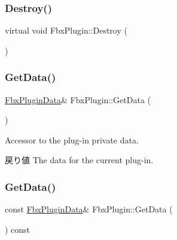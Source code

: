 \mbox{\label{class_fbx_plugin_a0a3b33c932cc862e539cef85d168b86a}} 
\subsubsection{\texorpdfstring{Destroy()}{Destroy()}}
{\footnotesize\ttfamily virtual void Fbx\+Plugin\+::\+Destroy (\begin{DoxyParamCaption}{ }\end{DoxyParamCaption})\hspace{0.3cm}{\ttfamily [pure virtual]}}

\mbox{\label{class_fbx_plugin_a2bcee62f35bb9ccaf60dddaa2bd42ed9}} 
\subsubsection{\texorpdfstring{Get\+Data()}{GetData()}\hspace{0.1cm}{\footnotesize\ttfamily [1/2]}}
{\footnotesize\ttfamily \hyperlink{struct_fbx_plugin_data}{Fbx\+Plugin\+Data}\& Fbx\+Plugin\+::\+Get\+Data (\begin{DoxyParamCaption}{ }\end{DoxyParamCaption})\hspace{0.3cm}{\ttfamily [protected]}}

Accessor to the plug-\/in private data. \begin{DoxyReturn}{戻り値}
The data for the current plug-\/in. 
\end{DoxyReturn}
\mbox{\label{class_fbx_plugin_aa35c615aa2b4b740ae01e6301503c844}} 
\subsubsection{\texorpdfstring{Get\+Data()}{GetData()}\hspace{0.1cm}{\footnotesize\ttfamily [2/2]}}
{\footnotesize\ttfamily const \hyperlink{struct_fbx_plugin_data}{Fbx\+Plugin\+Data}\& Fbx\+Plugin\+::\+Get\+Data (\begin{DoxyParamCaption}{ }\end{DoxyParamCaption}) const\hspace{0.3cm}{\ttfamily [protected]}}

